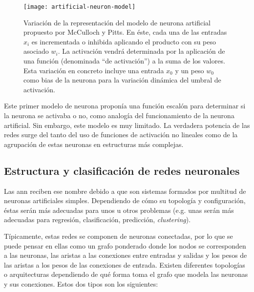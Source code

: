\begin{figure}
	\centering
	\texttt{[image: artificial-neuron-model]}
	\caption[Modelo de neurona artificial de McCulloch y Pitts]{Variación de la representación del modelo de neurona artificial propuesto por McCulloch y Pitts. En éste, cada una de las entradas $x_i$ es incrementada o inhibida aplicando el producto con su peso asociado $w_i$. La activación vendrá determinada por la aplicación de una función (denominada \enquote{de activación}) a la suma de los valores. Esta variación en concreto incluye una entrada $x_0$ y un peso $w_0$ como bias de la neurona para la variación dinámica del umbral de activación.}
	\label{fig:mccullocs-pitts-neuron-model}
\end{figure}

Este primer modelo de neurona proponía una función escalón para determinar si la neurona se activaba o no, como analogía del funcionamiento de la neurona artificial. Sin embargo, este modelo es muy limitado. La verdadera potencia de las redes surge del tanto del uso de funciones de activación no lineales como de la agrupación de estas neuronas en estructuras más complejas.

\subsection{Estructura y clasificación de redes neuronales}

Las \gls{ann} reciben ese nombre debido a que son sistemas formados por multitud de neuronas artificiales simples. Dependiendo de cómo su topología y configuración, éstas serán más adecuadas para unos u otros problemas (e.g. unas serán más adecuadas para regresión, clasificación, predicción, \textit{clustering}).

Típicamente, estas redes se componen de neuronas conectadas, por lo que se puede pensar en ellas como un grafo ponderado donde los nodos se corresponden a las neuronas, las aristas a las conexiones entre entradas y salidas y los pesos de las aristas a los pesos de las conexiones de entrada. Existen diferentes topologías o arquitecturas dependiendo de qué forma toma el grafo que modela las neuronas y sus conexiones. Estos dos tipos son los siguientes:

